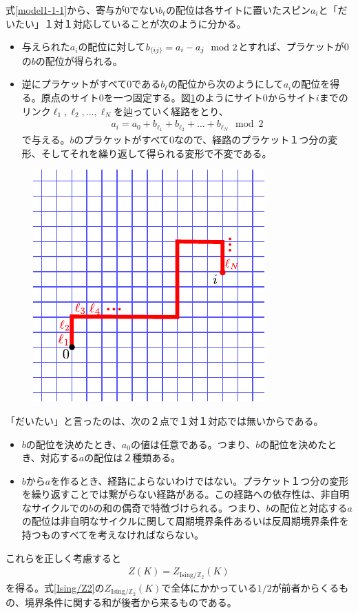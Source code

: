 \documentclass[a4paper,12pt,dvipdfmx]{jlreq}
\newcommand{\ZGIs}{Z_{\mathrm{Ising}/\mathbb{Z}_2}}
\begin{document}
式\eqref{model1-1-1}から、寄与が$0$でない$b_{\ell}$の配位は各サイトに置いたスピン$a_{i}$と「だいたい」１対１対応していることが次のように分かる。
\begin{itemize}
  \item 与えられた$a_{i}$の配位に対して$b_{\expval{ij}}=a_i-a_j \mod 2$とすれば、プラケットが$0$の$b$の配位が得られる。
  \item 逆にプラケットがすべて$0$である$b_{\ell}$の配位から次のようにして$a_{i}$の配位を得る。原点のサイト$0$を一つ固定する。図\ref{fig:path}のようにサイト$0$からサイト$i$までのリンク$\ell_1,\ell_2,\dots,\ell_N$を辿っていく経路をとり、
  \begin{align}
    a_{i}=a_{0}+b_{\ell_1}+b_{\ell_2}+\dots+b_{\ell_N} \mod 2
  \end{align}
  で与える。$b$のプラケットがすべて$0$なので、経路のプラケット１つ分の変形、そしてそれを繰り返して得られる変形で不変である。
\end{itemize}
\begin{figure}[htbp]
  \centering
  \includegraphics{path.pdf}
  \caption{{}}
  \label{fig:path}
\end{figure}

「だいたい」と言ったのは、次の２点で１対１対応では無いからである。
\begin{itemize}
  \item $b$の配位を決めたとき、$a_0$の値は任意である。つまり、$b$の配位を決めたとき、対応する$a$の配位は２種類ある。
  \item $b$から$a$を作るとき、経路によらないわけではない。プラケット１つ分の変形を繰り返すことでは繋がらない経路がある。この経路への依存性は、非自明なサイクルでの$b$の和の偶奇で特徴づけられる。つまり、$b$の配位と対応する$a$の配位は非自明なサイクルに関して周期境界条件あるいは反周期境界条件を持つものすべてを考えなければならない。
\end{itemize}
これらを正しく考慮すると
\begin{align}
  Z(K)=\ZGIs(K)
\end{align}
を得る。式\eqref{Ising/Z2}の$\ZGIs(K)$で全体にかかっている$1/2$が前者からくるもの、境界条件に関する和が後者から来るものである。
\end{document}
